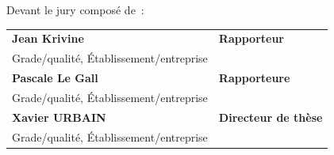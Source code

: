 \begin{titlepage}
\begin{center}
    \vspace{0.5cm}
    
    \end{center}
    
    Devant le jury composé de~:\\
    
    \small {
    \begin{tabular}{ll}
    \textbf{Jean Krivine}           &\textbf{Rapporteur}\\
      Grade/qualité, Établissement/entreprise\\
    \textbf{Pascale Le Gall}           &\textbf{Rapporteure}\\
      Grade/qualité, Établissement/entreprise\\
    \textbf{Xavier URBAIN}           &\textbf{Directeur de thèse}\\
      Grade/qualité, Établissement/entreprise\\
    \end{tabular}
    }
    
    
    \end{titlepage}